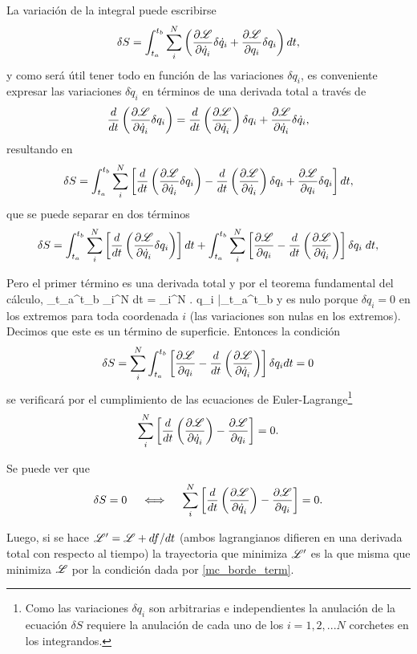 \documentclass[10pt,oneside]{CBFT_book}
\begin{document}
La variación de la integral puede escribirse 
\[
	\delta S =  \int_{t_a}^{t_b} \sum_i^N \left( \frac{\partial^{\hspace{-0.05em}} {\mathscr{L}}}{\partial {\dot{q}_i}^{\hspace{-0.05em}}} \delta \dot{q}_i +
	\frac{\partial^{\hspace{-0.05em}} {\mathscr{L}}}{\partial {q_i}^{\hspace{-0.05em}}} \delta q_i  \right) dt,
\]
y como será útil tener todo en función de las variaciones $\delta q_i$, es conveniente expresar las variaciones $ 
\delta \dot{q}_i $ en términos de una derivada total a través de  
\[
	\frac{d}{dt}\left( \frac{\partial^{\hspace{-0.05em}} {\mathscr{L}}}{\partial {\dot{q}_i}^{\hspace{-0.05em}}} \delta q_i \right) =
	\frac{d}{dt}\left( \frac{\partial^{\hspace{-0.05em}} {\mathscr{L}}}{\partial {\dot{q}_i}^{\hspace{-0.05em}}} \right) \delta q_i + \frac{\partial^{\hspace{-0.05em}} {\mathscr{L}}}{\partial {\dot{q}_i}^{\hspace{-0.05em}}}\delta \dot{q}_i,
\]
resultando en 
\[
	\delta S =  \int_{t_a}^{t_b} \sum_i^N \left[ \frac{d}{dt}\left( \frac{\partial^{\hspace{-0.05em}} {\mathscr{L}}}{\partial {\dot{q}_i}^{\hspace{-0.05em}}} \delta q_i \right) -
	\frac{d}{dt}\left( \frac{\partial^{\hspace{-0.05em}} {\mathscr{L}}}{\partial {\dot{q}_i}^{\hspace{-0.05em}}} \right) \delta q_i + \frac{\partial^{\hspace{-0.05em}} {\mathscr{L}}}{\partial {q_i}^{\hspace{-0.05em}}} \delta q_i  \right] dt,
\]
que se puede separar en dos términos
\[
	\delta S =  \int_{t_a}^{t_b} \sum_i^N \left[ \frac{d}{dt}\left( \frac{\partial^{\hspace{-0.05em}} {\mathscr{L}}}{\partial {\dot{q}_i}^{\hspace{-0.05em}}} \delta q_i \right) 
	\right] dt + \int_{t_a}^{t_b} \sum_i^N \left[ \frac{\partial^{\hspace{-0.05em}} {\mathscr{L}}}{\partial {q_i}^{\hspace{-0.05em}}} - \frac{d}{dt}\left( \frac{\partial^{\hspace{-0.05em}} {\mathscr{L}}}{\partial {\dot{q}_i}^{\hspace{-0.05em}}} 
	\right) \right]  \delta q_i \; dt,
\]

Pero el primer término es una derivada total y por el teorema fundamental del cálculo,
\be
	\int_{t_a}^{t_b} \sum_i^N  dt =
	\sum_i^N \left.  \delta q_i \: \right|_{t_a}^{t_b}
\label{mc_borde_term}
\ee
y es nulo porque $\delta q_i=0$ en los extremos para toda coordenada $i$ (las variaciones son nulas en los extremos). 
Decimos que este es un término de superficie. Entonces la condición 
\[
	\delta S =  \sum_i^N  \int_{t_a}^{t_b}
	\left[ \frac{\partial^{\hspace{-0.05em}} {\mathscr{L}}}{\partial {q_i}^{\hspace{-0.05em}}} - \frac{d}{dt}\left( \frac{\partial^{\hspace{-0.05em}} {\mathscr{L}}}{\partial {\dot{q}_i}^{\hspace{-0.05em}}} \right)  \right]  \delta q_i  dt = 0
\]
se verificará por el cumplimiento de las ecuaciones de Euler-Lagrange\footnote{Como las variaciones $\delta q_i$ son 
arbitrarias e independientes la anulación de la ecuación $ \delta S $ requiere la anulación de cada uno de los 
$i=1,2,...N $ corchetes en los integrandos.}
\[
	\sum_i^N  \left[ \frac{d}{dt}\left( \frac{\partial^{\hspace{-0.05em}} {\mathscr{L}}}{\partial {\dot{q}_i}^{\hspace{-0.05em}}} \right) - \frac{\partial^{\hspace{-0.05em}} {\mathscr{L}}}{\partial {q_i}^{\hspace{-0.05em}}} \right] = 0.
\]

Se puede ver que 
\[
	\delta S = 0 \quad \iff \quad \sum_i^N  \left[ \frac{d}{dt}\left( \frac{\partial^{\hspace{-0.05em}} {\mathscr{L}}}{\partial {\dot{q}_i}^{\hspace{-0.05em}}} \right) -
	\frac{\partial^{\hspace{-0.05em}} {\mathscr{L}}}{\partial {q_i}^{\hspace{-0.05em}}} \right] = 0.
\]


Luego, si se hace $\mathscr{L}' = \mathscr{L} + df/dt$ (ambos lagrangianos difieren en una derivada total con 
respecto al tiempo) la trayectoria que minimiza $\mathscr{L}'$ es la que misma que minimiza
$\mathscr{L}$ por la condición dada por \eqref{mc_borde_term}. 
\end{document}
